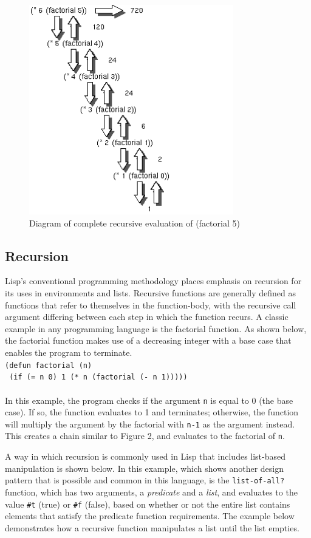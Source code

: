 \documentclass[journal]{IEEEtran}
\begin{document}
\begin{figure}[!t]
	\centering
	\includegraphics[width=3.5in]{factorial}
	\caption{Diagram of complete recursive evaluation of (factorial 5)}
	\label{Factorial}
\end{figure}

\subsection{Recursion}
Lisp's conventional programming methodology places emphasis on recursion for its uses in environments and lists. Recursive functions are generally defined as functions that refer to themselves in the function-body, with the recursive call argument differing between each step in which the function recurs. A classic example in any programming language is the factorial function. As shown below, the factorial function makes use of a decreasing integer with a base case that enables the program to terminate. \\

\texttt{(defun factorial (n)}\\\texttt{
	(if (= n 0)
	1
	(* n (factorial (- n 1)))))
}\\\\In this example, the program checks if the argument \texttt{n} is equal to 0 (the base case). If so, the function evaluates to 1 and terminates; otherwise, the function will multiply the argument by the factorial with \texttt{n-1} as the argument instead. This creates a chain similar to Figure 2, and evaluates to the factorial of \texttt{n}.

A way in which recursion is commonly used in Lisp that includes list-based manipulation is shown below. In this example, which shows another design pattern that is possible and common in this language, is the \texttt{list-of-all?} function, which has two arguments, a \textit{predicate} and a \textit{list}, and evaluates to the value \texttt{\#t} (true) or \texttt{\#f} (false), based on whether or not the entire list contains elements that satisfy the predicate function requirements. The example below demonstrates how a recursive function manipulates a list until the list empties.\\
\end{document}
